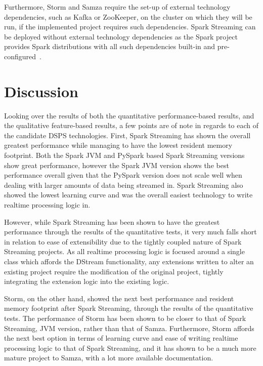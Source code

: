 Furthermore, Storm and Samza require the set-up of external technology dependencies, such as Kafka or ZooKeeper, on the
cluster on which they will be run, if the implemented project requires such dependencies. Spark Streaming can be deployed
without external technology dependencies as the Spark project provides Spark distributions with all such dependencies built-in
and pre-configured~\cite{web:spark-downloads}.




\section{Discussion} %
\label{sub:eval_discussion}

Looking over the results of both the quantitative performance-based results, and the qualitative feature-based results,
a few points are of note in regards to each of the candidate DSPS technologies. First, Spark Streaming has shown the
overall greatest performance while managing to have the lowest resident memory footprint. Both the Spark JVM and PySpark
based Spark Streaming versions show great performance, however the Spark JVM version shows the best performance overall
given that the PySpark version does not scale well when dealing with larger amounts of data being streamed in.
Spark Streaming also showed the lowest learning curve and was the overall easiest technology to write realtime processing
logic in.

However, while Spark Streaming has been shown to have the greatest performance through the results of the quantitative
tests, it very much falls short in relation to ease of extensibility due to the tightly coupled nature of Spark Streaming
projects. As all realtime processing logic is focused around a single class which affords the DStream functionality,
any extensions written to alter an existing project require the modification of the original project, tightly integrating the
extension logic into the existing logic.

Storm, on the other hand, showed the next best performance and resident memory footprint after Spark Streaming, through
the results of the quantitative tests. The performance of Storm has been shown to be closer to that of Spark Streaming,
JVM version, rather than that of Samza. Furthermore, Storm affords the next best option in terms of learning curve and
ease of writing realtime processing logic to that of Spark Streaming, and it has shown to be a much more mature project
to Samza, with a lot more available documentation.

